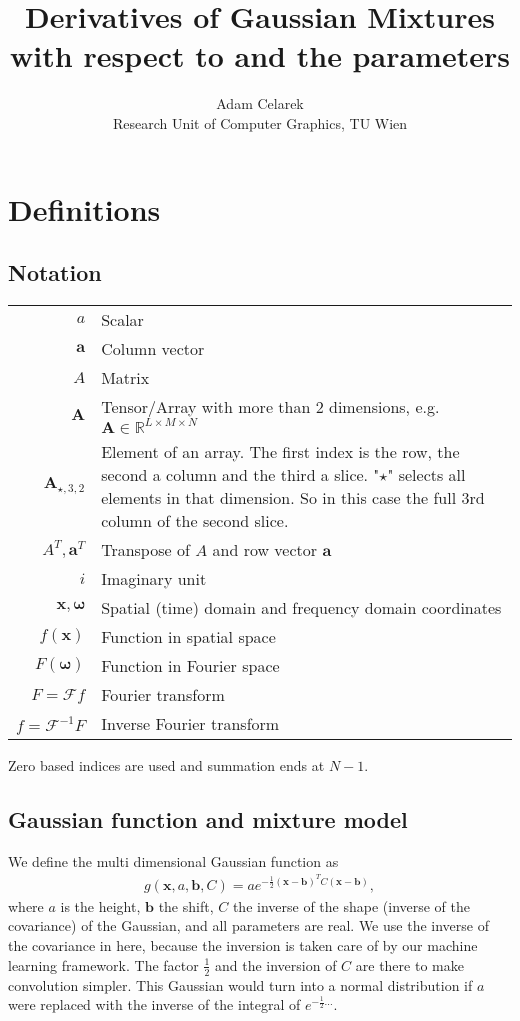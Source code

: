 \documentclass{paper}
\title{Derivatives of Gaussian Mixtures with respect to \vr{x} and the parameters}
\author{Adam Celarek\\Research Unit of Computer Graphics, TU Wien}
\newcommand{\F}{\ensuremath{\mathcal{F}}}
\newcommand{\vr}[1]{\ensuremath{\boldsymbol{#1}}}
\newcommand{\mx}[1]{\ensuremath{#1}}
\newcommand{\tr}[1]{\ensuremath{\boldsymbol{#1}}}
\begin{document}
\maketitle

\section{Definitions}
\subsection*{Notation}
\begin{center}
	\begin{supertabular}{rp{8cm}}
		$a$	& Scalar \\
		$\vr{a}$	& Column vector \\
		$\mx{A}$			& Matrix \\ 
		$\tr{A}$	& Tensor/Array with more than 2 dimensions, e.g. $\tr{A} \in \mathbb{R}^{L \times M \times N}$ \\ 
		$\tr{A}_{\star, 3, 2}$
					& Element of an array.
					The first index is the row, the second a column and the third a slice.
					"$\star$" selects all elements in that dimension.
					So in this case the full 3rd column of the second slice. \\ 
		$A^T, \vr{a}^T$
					& Transpose of $A$ and row vector $\vr{a}$ \\
		$i$			& Imaginary unit \\
		$\vr{x}, \vr{\omega}$
					& Spatial (time) domain and frequency domain coordinates \\
		$f(\vr{x})$
					& Function in spatial space \\
		$F(\vr{\omega})$
					& Function in Fourier space \\
		$F = \F f$
					& Fourier transform \\
		$f = \F^{-1} F$
					& Inverse Fourier transform \\
	\end{supertabular}
\end{center}
Zero based indices are used and summation ends at $N-1$.

\subsection*{Gaussian function and mixture model}
We define the multi dimensional Gaussian function as
\begin{align}
\label{eq:gaussian_definition}
g(\vr{x}, a, \vr{b}, C) = a e^{-\frac{1}{2}(\vr{x}-\vr{b})^TC(\vr{x}-\vr{b})},
\end{align}
where $a$ is the height, $\vr{b}$ the shift, $C$ the inverse of the shape (inverse of the covariance) of the Gaussian, and all parameters are real.
We use the inverse of the covariance in here, because the inversion is taken care of by our machine learning framework.
The factor $\frac{1}{2}$ and the inversion of $C$ are there to make convolution simpler.
This Gaussian would turn into a normal distribution if $a$ were replaced with the inverse of the integral of $e^{-\frac{1}{2}...}$.
\end{document}
